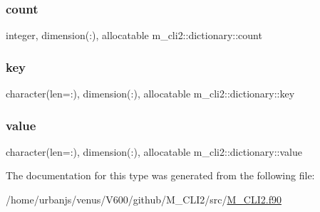 \subsubsection{\texorpdfstring{count}{count}}
{\footnotesize\ttfamily integer, dimension(\+:), allocatable m\+\_\+cli2\+::dictionary\+::count\hspace{0.3cm}{\ttfamily [private]}}

\mbox{\label{structm__cli2_1_1dictionary_a440bacfa9df210c811bef9fc3eab49ea}} 
\subsubsection{\texorpdfstring{key}{key}}
{\footnotesize\ttfamily character(len=\+:), dimension(\+:), allocatable m\+\_\+cli2\+::dictionary\+::key\hspace{0.3cm}{\ttfamily [private]}}

\mbox{\label{structm__cli2_1_1dictionary_a98cb2cb87235406680f49943b46dc2d0}} 
\subsubsection{\texorpdfstring{value}{value}}
{\footnotesize\ttfamily character(len=\+:), dimension(\+:), allocatable m\+\_\+cli2\+::dictionary\+::value\hspace{0.3cm}{\ttfamily [private]}}



The documentation for this type was generated from the following file\+:\begin{DoxyCompactItemize}
\item 
/home/urbanjs/venus/\+V600/github/\+M\+\_\+\+C\+L\+I2/src/\mbox{\hyperlink{M__CLI2_8f90}{M\+\_\+\+C\+L\+I2.\+f90}}\end{DoxyCompactItemize}
